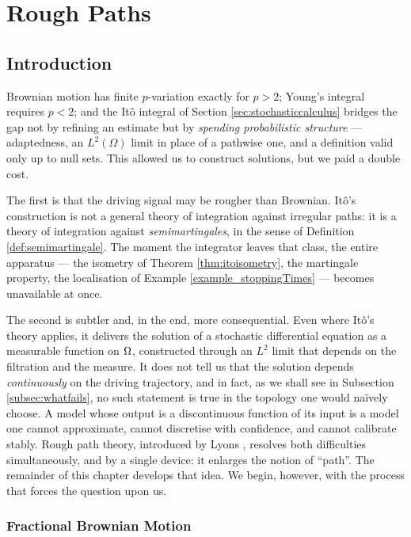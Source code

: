 \chapter{Rough Paths} \label{ch:roughpaths}

\section{Introduction}\label{sec:roughintro}

Brownian motion has finite $p$-variation exactly for $p>2$; Young's integral requires
$p<2$; and the Itô integral of Section \ref{sec:stochasticcalculus} bridges the gap not by refining
an estimate but by \emph{spending probabilistic structure} --- adaptedness, an $L^2(\Omega)$ limit
in place of a pathwise one, and a definition valid only up to null sets. This allowed us to construct solutions, but we paid a double cost.


The first is that the driving signal may be rougher than Brownian. Itô's construction is not a
general theory of integration against irregular paths: it is a theory of integration against
\emph{semimartingales}, in the sense of Definition \ref{def:semimartingale}. The moment the
integrator leaves that class, the entire apparatus --- the isometry of Theorem \ref{thm:itoisometry}, the martingale
property, the localisation of Example \ref{example_stoppingTimes} --- becomes unavailable at once.

The second is subtler and, in the end, more consequential. Even where Itô's theory applies, it
delivers the solution of a stochastic differential equation as a measurable function on $\Omega$,
constructed through an $L^2$ limit that depends on the filtration and the measure. It does not
tell us that the solution depends \emph{continuously} on the driving trajectory, and in fact, as
we shall see in Subsection \ref{subsec:whatfails}, no such statement is true in the topology one
would naïvely choose. A model whose output is a discontinuous
function of its input is a model one cannot approximate, cannot discretise with confidence, and
cannot calibrate stably. Rough path theory, introduced by Lyons \cite{lyons1998}, resolves both difficulties simultaneously,
and by a single device: it enlarges the notion of ``path''. The remainder of this chapter develops
that idea. We begin, however, with the process that forces the question upon us.

\subsection{Fractional Brownian Motion}\label{subsec:fbm}

